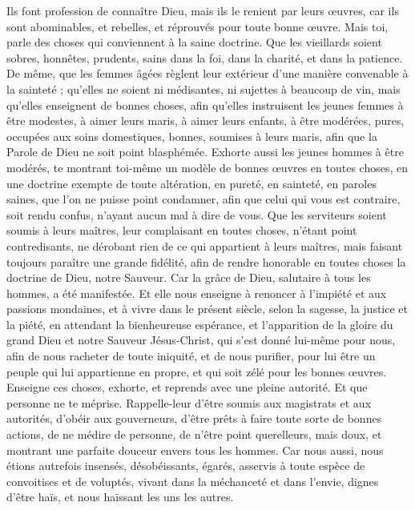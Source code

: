 \begin{multicols}{2}
Ils font profession de connaître Dieu, mais ils le renient par leurs œuvres, car ils sont abominables, et rebelles, et réprouvés pour toute bonne œuvre.
\VerseOne{}Mais toi, parle des choses qui conviennent à la saine doctrine.
Que les vieillards soient sobres, honnêtes, prudents, sains dans la foi, dans la charité, et dans la patience.
De même, que les femmes âgées règlent leur extérieur d'une manière convenable à la sainteté ; qu'elles ne soient ni médisantes, ni sujettes à beaucoup de vin, mais qu'elles enseignent de bonnes choses,
afin qu'elles instruisent les jeunes femmes à être modestes, à aimer leurs maris, à aimer leurs enfants,
à être modérées, pures, occupées aux soins domestiques, bonnes, soumises à leurs maris, afin que la Parole de Dieu ne soit point blasphémée.
Exhorte aussi les jeunes hommes à être modérés,
te montrant toi-même un modèle de bonnes œuvres en toutes choses, en une doctrine exempte de toute altération, en pureté, en sainteté,
en paroles saines, que l'on ne puisse point condamner, afin que celui qui vous est contraire, soit rendu confus, n'ayant aucun mal à dire de vous.
Que les serviteurs soient soumis à leurs maîtres, leur complaisant en toutes choses, n'étant point contredisants,
ne dérobant rien de ce qui appartient à leurs maîtres, mais faisant toujours paraître une grande fidélité, afin de rendre honorable en toutes choses la doctrine de Dieu, notre Sauveur.
Car la grâce de Dieu, salutaire à tous les hommes, a été manifestée.
Et elle nous enseigne à renoncer à l'impiété et aux passions mondaines, et à vivre dans le présent siècle, selon la sagesse, la justice et la piété,
en attendant la bienheureuse espérance, et l'apparition de la gloire du grand Dieu et notre Sauveur Jésus-Christ,
qui s'est donné lui-même pour nous, afin de nous racheter de toute iniquité, et de nous purifier, pour lui être un peuple qui lui appartienne en propre, et qui soit zélé pour les bonnes œuvres.
Enseigne ces choses, exhorte, et reprends avec une pleine autorité. Et que personne ne te méprise.
\VerseOne{}Rappelle-leur d'être soumis aux magistrats et aux autorités, d'obéir aux gouverneurs, d'être prêts à faire toute sorte de bonnes actions,
de ne médire de personne, de n'être point querelleurs, mais doux, et montrant une parfaite douceur envers tous les hommes.
Car nous aussi, nous étions autrefois insensés, désobéissants, égarés, asservis à toute espèce de convoitises et de voluptés, vivant dans la méchanceté et dans l'envie, dignes d'être haïs, et nous haïssant les uns les autres.

\end{multicols}
